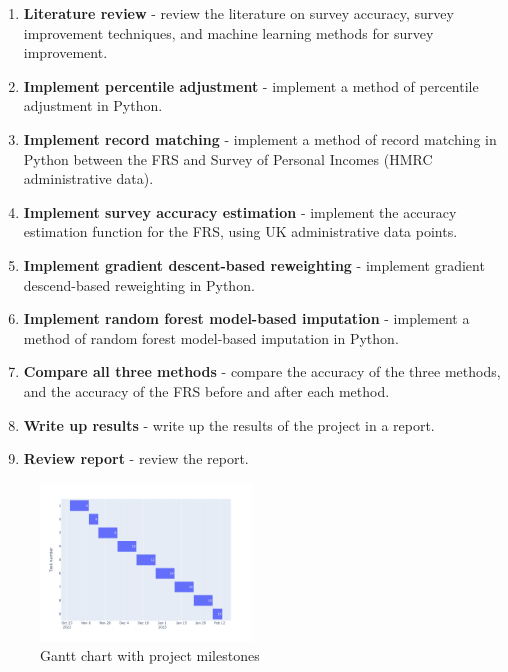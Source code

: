 \documentclass[twocolumn]{article}
\begin{document}
\begin{enumerate}
    \item \textbf{Literature review} - review the literature on survey accuracy, survey improvement techniques, and machine learning methods for survey improvement.
    \item \textbf{Implement percentile adjustment} - implement a method of percentile adjustment in Python.
    \item \textbf{Implement record matching} - implement a method of record matching in Python between the FRS and Survey of Personal Incomes (HMRC administrative data).
    \item \textbf{Implement survey accuracy estimation} - implement the accuracy estimation function for the FRS, using UK administrative data points.
    \item \textbf{Implement gradient descent-based reweighting} - implement gradient descend-based reweighting in Python.
    \item \textbf{Implement random forest model-based imputation} - implement a method of random forest model-based imputation in Python.
    \item \textbf{Compare all three methods} - compare the accuracy of the three methods, and the accuracy of the FRS before and after each method.
    \item \textbf{Write up results} - write up the results of the project in a report.
    \item \textbf{Review report} - review the report.
\end{enumerate}

\begin{figure}
    \centering
    \includegraphics[width=0.5\textwidth]{gantt_chart.pdf}
    \caption{Gantt chart with project milestones}
    \label{gantt_chart}
\end{figure}
\end{document}
